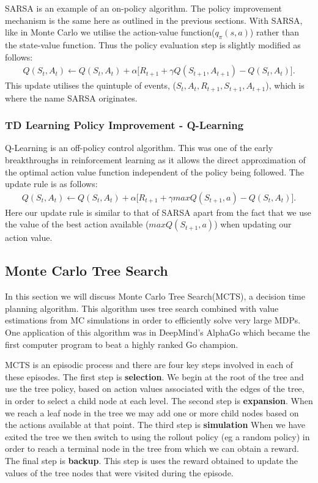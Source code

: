 SARSA is an example of an on-policy algorithm.
The policy improvement mechanism is the same here as outlined in the previous sections.
With SARSA, like in Monte Carlo we utilise the action-value function($q_{\pi}(s, a)$) rather
than the state-value function.
Thus the policy evaluation step is slightly modified as follows:
\begin{align}
    Q(S_t, A_t) \leftarrow Q(S_t, A_t) + \alpha \lbrack R_{t+1} + \gamma Q(S_{t+1}, A_{t+1}) - Q(S_t, A_t) \rbrack.
\end{align}
This update utilises the quintuple of events, ($S_t, A_t, R_{t+1}, S_{t+1}, A_{t+1}$), which is where the
name SARSA originates.


\subsubsection{TD Learning Policy Improvement - Q-Learning}
Q-Learning is an off-policy control algorithm.
This was one of the early breakthroughs in reinforcement learning as it allows the direct approximation of
the optimal action value function independent of the policy being followed.
The update rule is as follows:
\begin{align}
    Q(S_t, A_t) \leftarrow Q(S_t, A_t) + \alpha \lbrack R_{t+1} + \gamma maxQ(S_{t+1}, a) - Q(S_t, A_t) \rbrack.
\end{align}
Here our update rule is similar to that of SARSA apart from the fact that we use the value of the best
action available ($maxQ(S_{t+1}, a)$) when updating our action value.

\subsection{Monte Carlo Tree Search}\label{subsec:mcts}
In this section we will discuss Monte Carlo Tree Search(MCTS), a decision time planning algorithm.
This algorithm uses tree search combined with value estimations from MC simulations in order to
efficiently solve very large MDPs.
One application of this algorithm was in DeepMind's AlphaGo\citep{silver2016mastering} which became the
first computer program to beat a highly ranked Go champion.

MCTS is an episodic process and there are four key steps involved in each of these episodes.
The first step is \textbf{selection}.
We begin at the root of the tree and use the tree policy, based on action values associated with the edges
of the tree, in order to select a child node at each level\citep{sutton1998reinforcement}.
The second step is \textbf{expansion}.
When we reach a leaf node in the tree we may add one or more child nodes based on
the actions available at that point.
The third step is \textbf{simulation}
When we have exited the tree we then switch to using the rollout policy (eg a random policy) in
order to reach a terminal node in the tree from which we can obtain a reward.
The final step is \textbf{backup}.
This step is uses the reward obtained to update the values of the tree nodes that were visited
during the episode.

